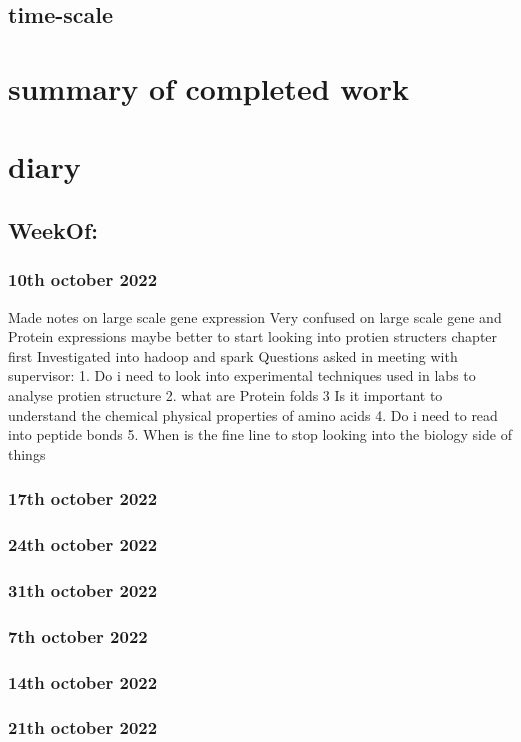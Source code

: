 \documentclass{report}
\begin{document}
\subsection{time-scale}

\section{summary of completed work}


\section{diary}

\subsection*{WeekOf:}
\subsubsection{10th october 2022}
Made notes on large scale gene expression
Very confused on large scale gene and Protein expressions maybe better to start looking into protien structers chapter first
Investigated into hadoop and spark
Questions asked in meeting with supervisor: 
1. Do i need to look into experimental techniques used in labs to analyse protien structure 
2. what are Protein folds
3 Is it important to understand the chemical physical properties of amino acids
4. Do i need to read into peptide bonds
5. When is the fine line to stop looking into the biology side of things
\subsubsection{17th october 2022}
\subsubsection{24th october 2022}
\subsubsection{31th october 2022}
\subsubsection{7th october 2022}
\subsubsection{14th october 2022}
\subsubsection{21th october 2022}



\end{document}
